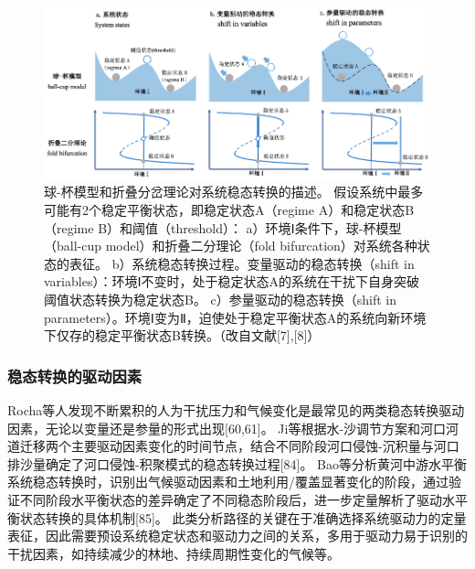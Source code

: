 \begin{figure}[htb] %
    \centering
    \includegraphics[width=\textwidth]{img/ch2/ch2_regime_shift.png}
    \caption[球-杯模型和折叠分岔理论对系统稳态转换的描述]{球-杯模型和折叠分岔理论对系统稳态转换的描述。
    假设系统中最多可能有2个稳定平衡状态，即稳定状态A（regime A）和稳定状态B（regime B）和阈值（threshold）：
    a）环境Ⅰ条件下，球-杯模型（ball-cup model）和折叠二分理论（fold bifurcation）对系统各种状态的表征。
    b）系统稳态转换过程。变量驱动的稳态转换（shift in variables）：环境Ⅰ不变时，处于稳定状态A的系统在干扰下自身突破阈值状态转换为稳定状态B。
    c）参量驱动的稳态转换（shift in parameters）。环境Ⅰ变为Ⅱ，迫使处于稳定平衡状态A的系统向新环境下仅存的稳定平衡状态B转换。（改自文献[7],[8]）}\label{ch2:fig:regime_shift}
\end{figure}

\subsubsection*{稳态转换的驱动因素}

Rocha等人发现不断累积的人为干扰压力和气候变化是最常见的两类稳态转换驱动因素，无论以变量还是参量的形式出现[60,61]。
Ji等根据水-沙调节方案和河口河道迁移两个主要驱动因素变化的时间节点，结合不同阶段河口侵蚀-沉积量与河口排沙量确定了河口侵蚀-积聚模式的稳态转换过程[84]。
Bao等分析黄河中游水平衡系统稳态转换时，识别出气候驱动因素和土地利用/覆盖显著变化的阶段，通过验证不同阶段水平衡状态的差异确定了不同稳态阶段后，进一步定量解析了驱动水平衡状态转换的具体机制[85]。
此类分析路径的关键在于准确选择系统驱动力的定量表征，因此需要预设系统稳定状态和驱动力之间的关系，多用于驱动力易于识别的干扰因素，如持续减少的林地、持续周期性变化的气候等。

